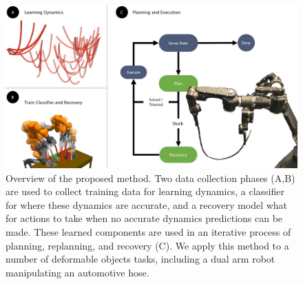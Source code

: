 \begin{figure}
    \centering
    \includegraphics[width=0.8\linewidth]{Chap2/images/figure1}
    \caption{Overview of the proposed method. Two data collection phases (A,B) are used to collect training data for learning dynamics, a classifier for where these dynamics are accurate, and a recovery model what for actions to take when no accurate dynamics predictions can be made. These learned components are used in an iterative process of planning, replanning, and recovery (C). We apply this method to a number of deformable objects tasks, including a dual arm robot manipulating an automotive hose.}
    \label{Scirob:fig:figure1}
\end{figure}